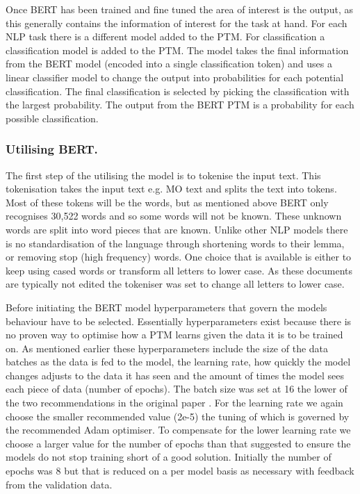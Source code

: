 Once BERT has been trained and fine tuned the area of interest is the output, as this generally contains the information of interest for the task at hand. For each NLP task there is a different model added to the PTM. For classification a classification model is added to the PTM. The model takes the final information from the BERT model (encoded into a single classification token) and uses a linear classifier model to change the output into probabilities for each potential classification. The final classification is selected by picking the classification with the largest probability. The output from the BERT PTM is a probability for each possible classification.

\subsubsection{Utilising BERT.}  The first step of the utilising the model is to tokenise the input text. This tokenisation takes the input text e.g. MO text and splits the text into tokens. Most of these tokens will be the words, but as mentioned above BERT only recognises 30,522 words and so some words will not be known. These unknown words are split into word pieces that are known. Unlike other NLP models there is no standardisation of the language through shortening words to their lemma, or removing stop (high frequency) words. One choice that is available is either to keep using cased words or transform all letters to lower case. As these documents are typically not edited the tokeniser was set to change all letters to lower case.

Before initiating the BERT model hyperparameters that govern the models behaviour have to be selected. Essentially hyperparameters exist because there is no proven way to optimise how a PTM learns given the data it is to be trained on. As mentioned earlier these hyperparameters include the size of the data batches as the data is fed to the model, the learning rate, how quickly the model changes adjusts to the data it has seen and the amount of times the model sees each piece of data (number of epochs). The batch size was set at 16 the lower of the two recommendations in the original paper \parencite{devlin2018bert}. For the learning rate we again choose the smaller recommended value (2e-5) the tuning of which is governed by the recommended Adam optimiser. To compensate for the lower learning rate we choose a larger value for the number of epochs than that suggested to ensure the models do not stop training short of a good solution. Initially the number of epochs was 8 but that is reduced on a per model basis as necessary with feedback from the validation data.

